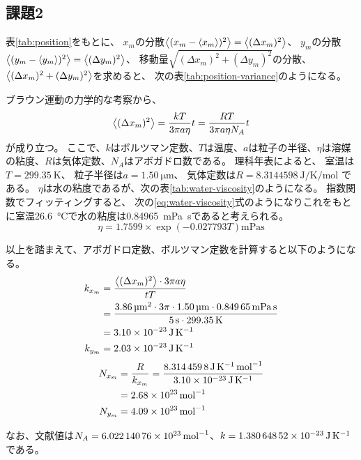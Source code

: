 \subsection{課題2}\label{subsec:report-2}

表\ref{tab:position}をもとに、
$x_m$の分散$\left< (x_m-\left< x_m \right>)^2 \right>=\left< (\Delta x_m)^2 \right>$、
$y_m$の分散$\left< (y_m-\left< y_m \right>)^2 \right>=\left< (\Delta y_m)^2 \right>$、
移動量$\sqrt{(\Delta x_m)^2 + (\Delta y_m)^2}$の分散、$\left< (\Delta x_m)^2 + (\Delta y_m)^2 \right>$を求めると、
次の表\ref{tab:position-variance}のようになる。



ブラウン運動の力学的な考察から、
\begin{equation}\label{eq:brownian-motion}
    \left< (\Delta x_m)^2 \right> = \dfrac{kT}{3\pi a \eta} t = \dfrac{RT}{3 \pi a \eta N_A} t
\end{equation}
が成り立つ。
ここで、$k$はボルツマン定数、$T$は温度、$a$は粒子の半径、$\eta$は溶媒の粘度、$R$は気体定数、$N_A$はアボガドロ数である。
理科年表\cite{rika-nenpyo}によると、
室温は$T=\SI{299.35}{\kelvin}$、
粒子半径は$a=\SI{1.50}{\micro\meter}$、
気体定数は$R=\SI{8.3144598}{\joule\per\kelvin\per\mole}$
である。
$\eta$は水の粘度であるが、次の表\ref{tab:water-viscosity}のようになる。
指数関数でフィッティングすると、
次の\ref{eq:water-viscosity}式のようになりこれをもとに室温\SI{26.6}{\celsius}で水の粘度は\SI{0.84965}{\milli\pascal\second}であると考えられる。
\begin{equation}\label{eq:water-viscosity}
    \eta = 1.7599 \times \exp(-0.027793T) \si{\milli\pascal\second}
\end{equation}



以上を踏まえて、アボガドロ定数、ボルツマン定数を計算すると以下のようになる。
\begin{align}
    k_{x_m} & = \dfrac{\left< (\Delta x_m)^2 \right> \cdot 3 \pi a \eta}{tT}                                                                                                            \nonumber          \\
            & = \dfrac{\SI{3.86}{\micro\meter\squared} \cdot 3 \pi \cdot \SI{1.50}{\micro\meter} \cdot \SI{0.84965}{\milli\pascal\second}}{\SI{5}{\second} \cdot \SI{299.35}{\kelvin}} \nonumber \\
            & = \SI{3.10E-23}{\joule\per\kelvin}                                                                                                                                                 \\
    k_{y_m} & = \SI{2.03E-23}{\joule\per\kelvin}
\end{align}
\begin{align}
    N_{x_m} & = \dfrac{R}{k_{x_m}} = \dfrac{\SI{8.3144598}{\joule\per\kelvin\per\mole}}{\SI{3.10E-23}{\joule\per\kelvin}} \nonumber \\
            & = \SI{2.68E23}{\per\mole}                                                                                             \\
    N_{y_m} & = \SI{4.09E23}{\per\mole}
\end{align}

なお、文献値は$N_A=\SI{6.02214076E23}{\per\mole}$、$k=\SI{1.38064852E-23}{\joule\per\kelvin}$である。
